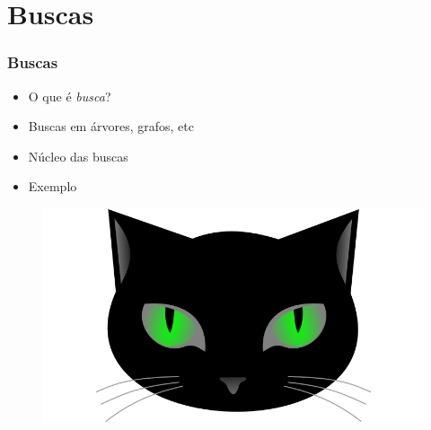 
\section{Buscas}


\begin{frame}
\frametitle{Buscas}
\begin{minipage}{0.47\textwidth}
    \begin{itemize}
        \item O que é \textit{busca}?
        \item Buscas em árvores, grafos, etc
        \item Núcleo das buscas
        \item Exemplo
    \end{itemize}
\end{minipage}
\begin{minipage}{0.5\textwidth}
\begin{figure}[ht!]
\begin{center}
\includegraphics[width=1.2\textwidth, height=0.40\textheight]{figures/logo_picat_alex.jpg}
\end{center}
\end{figure}
\end{minipage}
\end{frame}




